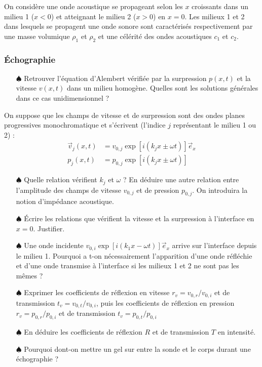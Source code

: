 \documentclass{report}
\begin{document}
On considère une onde acoustique se propageant selon les $x$ croissants dans un milieu 1 ($x<0$) et atteignant le milieu 2 ($x>0$) en $x=0$. Les milieux 1 et 2 dans lesquels se propagent une onde sonore sont caractérisés respectivement par une masse volumique $\rho_1$ et $\rho_2$ et une célérité des ondes acoustiques $c_1$ et $c_2$. 

\subsubsection*{Échographie}

\begin{itemize}
	
	\item[$\spadesuit$] Retrouver l'équation d'Alembert vérifiée par la surpression $p(x,t)$ et la vitesse $v(x,t)$ dans un milieu homogène. Quelles sont les solutions générales dans ce cas unidimensionnel ? 

\end{itemize}	
	
On suppose que les champs de vitesse et de surpression sont des ondes planes progressives monochromatique et s'écrivent (l'indice $j$ représentant le milieu 1 ou 2) :
\begin{align*}
	\vec{v}_j(x,t)&=v_{0,j}\exp\left[i(k_jx\pm \omega t) \right] \vec{e}_x \\
	p_j(x,t)&=p_{0,j}\exp\left[i(k_jx\pm \omega t) \right]
\end{align*}

\begin{itemize}
	
	\item[$\spadesuit$] Quelle relation vérifient $k_j$ et $\omega$ ? En déduire une autre relation entre l'amplitude des champs de vitesse $v_{0,j}$ et de pression $p_{0,j}$. On introduira la notion d'impédance acoustique.
	
	\item[$\spadesuit$] Écrire les relations que vérifient la vitesse et la surpression à l'interface en $x=0$. Justifier. 
	
	\item[$\spadesuit$] Une onde incidente $v_{0,i}\exp\left[i(k_1x- \omega t) \right] \vec{e}_x$  arrive sur l'interface depuis le milieu 1. Pourquoi a t-on nécessairement l'apparition d'une onde réfléchie et d'une onde transmise à l'interface si les milieux 1 et 2 ne sont pas les mêmes ?
	
	\item[$\spadesuit$] Exprimer les coefficients de réflexion en vitesse $r_v=v_{0,r}/v_{0,i}$ et de transmission $t_v=v_{0,t}/v_{0,i}$, puis les coefficients de réflexion en pression $r_v=p_{0,r}/p_{0,i}$ et de transmission $t_v=p_{0,t}/p_{0,i}$
	
	\item[$\spadesuit$]	 En déduire les coefficients de réflexion $R$ et de transmission $T$ en intensité. 
	
	\item[$\spadesuit$] Pourquoi dont-on mettre un gel sur entre la sonde et le corps durant une échographie ? 
		
\end{itemize}
\end{document}
